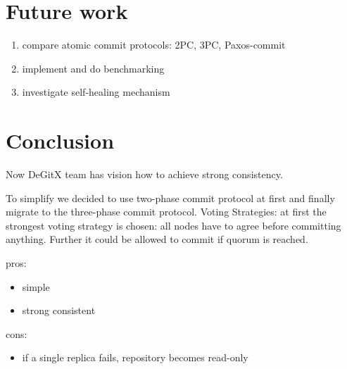 \documentclass[acmlarge, screen, nonacm]{acmart}
\begin{document}
\section{Future work}

\begin{enumerate}
  \item compare atomic commit protocols: 2PC, 3PC, Paxos-commit
  \item implement and do benchmarking
  \item investigate self-healing mechanism
\end{enumerate}

\section{Conclusion}

Now DeGitX team has vision how to achieve strong consistency.

To simplify we decided to use two-phase commit protocol at first and finally migrate to the three-phase commit protocol.
Voting Strategies: at first the strongest voting strategy is chosen:
all nodes have to agree before committing anything.
Further it could be allowed to commit if quorum is reached.

pros:
\begin{itemize}
  \item simple
  \item strong consistent
\end{itemize}

cons:
\begin{itemize}
  \item if a single replica fails, repository becomes read-only
\end{itemize}
\end{document}
